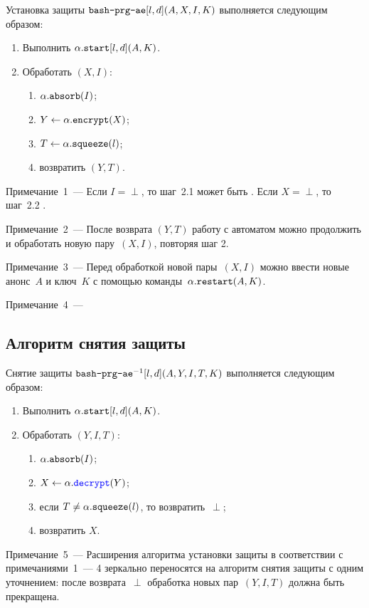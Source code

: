 Установка защиты $\texttt{bash-prg-ae}[l,d](A,X,I,K)$ выполняется следующим образом:
\begin{enumerate}
\item
Выполнить $\alpha.\texttt{start}[l,d](A,K)$.
\item
Обработать $(X,I)$:
\begin{enumerate}
\item
$\alpha.\texttt{absorb}(I)$;
\item
$Y\leftarrow\alpha.\texttt{encrypt}(X)$;
\item
$T\leftarrow \alpha.\texttt{squeeze}(l)$;
\item
возвратить $(Y,T)$.
\end{enumerate}
\end{enumerate}

\begin{note}
Примечание~1~--- 
Если $I=\perp$, то шаг~2.1 может быть .
%
Если $X=\perp$, то шаг~2.2 .
%
\end{note}

\begin{note}
Примечание~2~--- После возврата $(Y,T)$ работу с автоматом
можно продолжить и обработать новую пару~$(X,I)$, повторяя шаг 2.
\end{note}

\begin{note}
Примечание~3~--- Перед обработкой новой пары~$(X,I)$ можно ввести
новые анонс~$A$ и ключ~$K$ с помощью 
команды~$\alpha.\texttt{restart}(A, K)$.
\end{note}

\begin{note}
Примечание~4~--- 
\end{note}

\subsection{Алгоритм снятия защиты}\label{PRG.AE.Unwrap}

Снятие защиты $\texttt{bash-prg-ae}^{-1}[l,d](A,Y,I,T,K)$ выполняется 
следующим образом:
\begin{enumerate}
\item
Выполнить $\alpha.\texttt{start}[l,d](A,K)$.
\item
Обработать $(Y,I,T)$:
\begin{enumerate}
\item
$\alpha.\texttt{absorb}(I)$;
\item
$X\leftarrow\alpha.\textcolor{blue}{\texttt{decrypt}}(Y)$;
\item
если $T\neq\alpha.\texttt{squeeze}(l)$, то возвратить~$\perp$;
\item
возвратить $X$.
\end{enumerate}
\end{enumerate}

\begin{note}
Примечание~5~--- Расширения алгоритма установки защиты в соответствии 
с примечаниями~1~--- 4 зеркально переносятся на алгоритм снятия защиты
с одним уточнением: после возврата~$\perp$ обработка новых пар~$(Y,I,T)$
должна быть прекращена.
\end{note}
